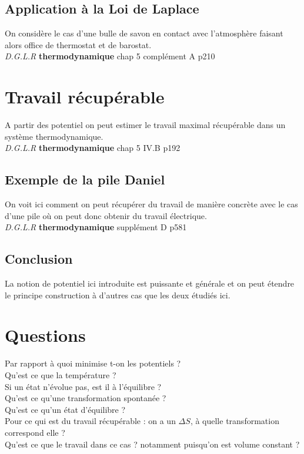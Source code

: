 \documentclass[12pt,prb,aps,epsf]{article}
\begin{document}
\subsection{Application à la Loi de Laplace}
On considère le cas d'une bulle de savon en contact avec l'atmosphère faisant alors office de thermostat et de barostat.\\
\textit{D.G.L.R} \textbf{thermodynamique} chap 5 complément A p210


\section{Travail récupérable}
A partir des potentiel on peut estimer le travail maximal récupérable dans un système thermodynamique.\\
\textit{D.G.L.R} \textbf{thermodynamique} chap 5 IV.B p192

\subsection{Exemple de la pile Daniel}
On voit ici comment on peut récupérer du travail de manière concrète avec le cas d'une pile où on peut donc obtenir du travail électrique.\\
\textit{D.G.L.R} \textbf{thermodynamique} supplément D p581

\subsection*{Conclusion}
La notion de potentiel ici introduite est puissante et générale et on peut étendre le principe construction à d'autres cas que les deux étudiés ici. 

\section*{Questions}
Par rapport à quoi minimise t-on les potentiels ?\\

Qu'est ce que la température ?\\

Si un état n'évolue pas, est il à l'équilibre ?\\

Qu'est ce qu'une transformation spontanée ?\\

Qu'est ce qu'un état d'équilibre ?\\

Pour ce qui est du travail récupérable : on a un $\Delta S$, à quelle transformation correspond elle ?\\
Qu'est ce que le travail dans ce cas ? notamment puisqu'on est volume constant ?
\end{document}
